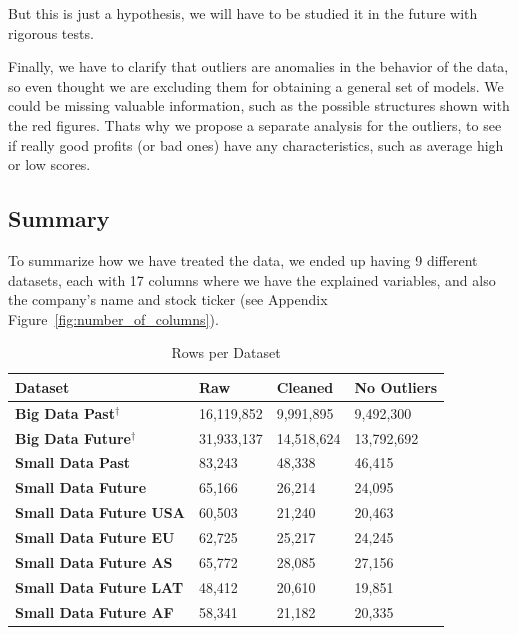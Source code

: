 \documentclass[11pt,english,a4paper,hidelinks]{book}
\begin{document}
\noindent But this is just a hypothesis, we will have to be studied it in the future with rigorous tests.

\vspace{0.5cm}
\noindent Finally, we have to clarify that outliers are anomalies in the behavior of the data, so even thought we are excluding them for obtaining a general set of models. We could be missing valuable information, such as the possible structures shown with the red figures. Thats why we propose a separate analysis for the outliers, to see if really good profits (or bad ones) have any characteristics, such as average high or low scores.

\subsection{Summary}
\vspace{0.5cm}
\noindent To summarize how we have treated the data, we ended up having 9 different datasets, each with 17 columns where we have the explained variables, and also the company's name and stock ticker (see Appendix Figure~\ref{fig:number_of_columns}).

\begin{table}[H]
    \centering
    \begin{tabular}{|l|l|l|l|}
        \hline  
        \textbf{Dataset} & \textbf{Raw} & \textbf{Cleaned} & \textbf{No Outliers} \\
        \hline
        \textbf{Big Data Past$^\dagger$} & 16,119,852 & 9,991,895 & 9,492,300 \\
        \hline
        \textbf{Big Data Future$^\dagger$} & 31,933,137 & 14,518,624 & 13,792,692 \\
        \hline 
        \textbf{Small Data Past} & 83,243 & 48,338 & 46,415 \\
        \hline
        \textbf{Small Data Future} & 65,166 & 26,214 & 24,095 \\
        \hline
        \textbf{Small Data Future USA} & 60,503 & 21,240 & 20,463 \\
        \hline
        \textbf{Small Data Future EU} & 62,725 & 25,217 & 24,245 \\
        \hline        
        \textbf{Small Data Future AS} & 65,772 & 28,085 & 27,156\\
        \hline
        \textbf{Small Data Future LAT} & 48,412 & 20,610 & 19,851 \\
        \hline
        \textbf{Small Data Future AF} & 58,341 & 21,182 & 20,335 \\
        \hline
        \end{tabular}

    \caption{Rows per Dataset}
    \label{tab:datasets_summary}
\end{table}
\end{document}
